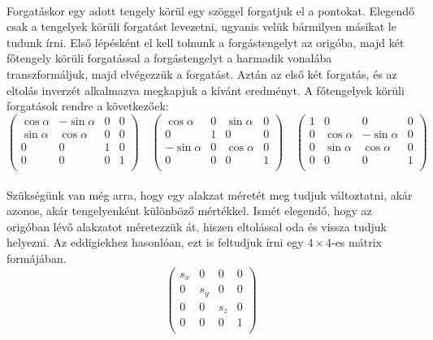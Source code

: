 \documentclass[12pt]{report}
\begin{document}
\paragraph{}
Forgatáskor egy adott tengely körül egy szöggel forgatjuk el a pontokat. Elegendő csak a tengelyek körüli forgatást levezetni, ugyanis velük bármilyen másikat le tudunk írni. Első lépésként el kell tolnunk a forgástengelyt az origóba, majd két főtengely körüli forgatással a forgástengelyt a harmadik vonalába transzformáljuk, majd elvégezzük a forgatást. Aztán az első két forgatás, és az eltolás inverzét alkalmazva megkapjuk a kívánt eredményt. A főtengelyek körüli forgatások rendre a következőek:
$$
\left( \begin{array}{cccc}
	\cos\alpha & -\sin\alpha & 0 & 0 \\
	\sin\alpha & \cos\alpha & 0 & 0 \\
	0 & 0 & 1 & 0 \\
	0 & 0 & 0 & 1 \\
\end{array} \right)
\quad
\left( \begin{array}{cccc}
	\cos\alpha & 0 & \sin\alpha & 0 \\
	0 & 1 & 0 & 0 \\
	-\sin\alpha & 0 & \cos\alpha & 0 \\
	0 & 0 & 0 & 1 \\
\end{array} \right)
\quad
\left( \begin{array}{cccc}
	1 & 0 & 0 & 0 \\
	0 & \cos\alpha & -\sin\alpha & 0 \\
	0 & \sin\alpha & \cos\alpha & 0 \\
	0 & 0 & 0 & 1 \\
\end{array} \right)
$$
\paragraph{}
Szükségünk van még arra, hogy egy alakzat méretét meg tudjuk változtatni, akár azonos, akár tengelyenként különböző mértékkel. Ismét elegendő, hogy az origóban lévő alakzatot méretezzük át, hiszen eltolással oda és vissza tudjuk helyezni.  Az eddigiekhez hasonlóan, ezt is feltudjuk írni egy $4 \times 4$-es mátrix formájában.
$$
\left( \begin{array}{cccc}
	s_x & 0 & 0 & 0 \\
	0 & s_y & 0 & 0 \\
	0 & 0 & s_z & 0 \\
	0 & 0 & 0 & 1 \\
\end{array} \right)
$$
\end{document}
